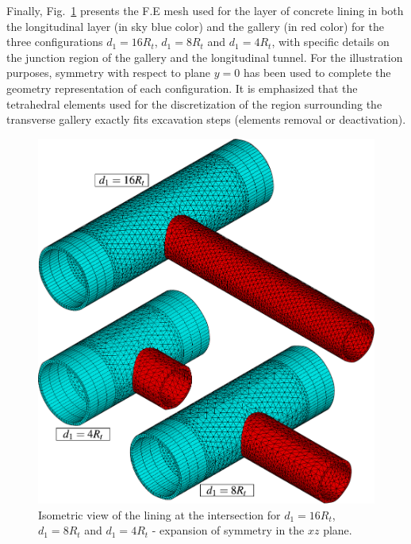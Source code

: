 \documentclass[a4paper,fleqn]{cas-sc}
\begin{document}
Finally, Fig.~\ref{Mesh6} presents the F.E mesh used for the layer of concrete lining in both the longitudinal layer (in sky blue color) and the gallery (in red color) for the three configurations $d_1=16R_t$, $d_1=8R_t$ and $d_1=4R_t$, with specific details on the junction region of the gallery and the longitudinal tunnel. For the illustration purposes, symmetry with respect to plane $y = 0$ has been used to complete the geometry representation of each configuration. It is emphasized that the tetrahedral elements used for the discretization of the region surrounding the transverse gallery exactly fits excavation steps (elements removal or deactivation).

\begin{figure}[h!]
	\centering
	\includegraphics[scale=0.6]{Mesh6.pdf}
	\caption{Isometric view of the lining at the intersection for $d_1=16R_t$, $d_1=8R_t$ and $d_1=4R_t$ - expansion of symmetry in the $xz$ plane.}
	\label{Mesh6}
\end{figure}
\FloatBarrier
\end{document}
